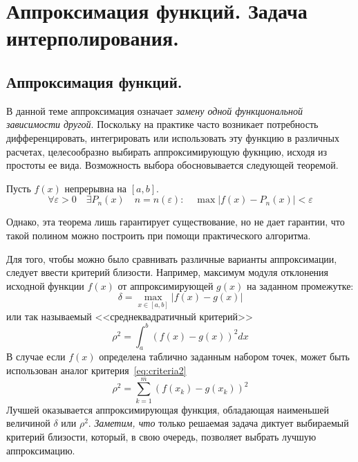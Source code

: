 \documentclass[../../calc-math-exam-2023.tex]{subfiles}
\begin{document}
    \section{Аппроксимация функций. Задача интерполирования.}\label{sec:ch05}
    \subsection{Аппроксимация функций.}
    В данной теме аппроксимация означает \emph{замену одной функциональной зависимости
    другой}. Поскольку на практике часто возникает потребность дифференцировать,
    интегрировать или использовать эту функцию в различных расчетах, целесообразно
    выбирать аппроксимирующую фукнцию, исходя из простоты ее вида. Возможность выбора
    обосновывается следующей теоремой.
    \begin{theorem}
        Пусть $f(x)$ непрерывна на $[a, b]$.
        \begin{equation*}
            \forall \varepsilon > 0 \quad \exists P_n(x) \quad n = n(\varepsilon) : \quad \max |f(x) - P_n(x)| < \varepsilon
        \end{equation*}
    \end{theorem}
    Однако, эта теорема лишь гарантирует существование, но не дает гарантии, что такой полином
    можно построить при помощи практического алгоритма.

    Для того, чтобы можно было сравнивать различные варианты аппроксимации, следует
    ввести критерий близости. Например, максимум модуля отклонения исходной функции
    $f(x)$ от аппроксимирующей $g(x)$ на заданном промежутке:
    \begin{equation}
        \delta = \max_{x \in [a, b]} |f(x) - g(x)|\label{eq:criteria1}
    \end{equation}
    или так называемый <<среднеквадратичный критерий>>
    \begin{equation}
        \rho^2 = \int_a^b \left( f(x) - g(x) \right)^2 dx\label{eq:criteria2}
    \end{equation}
    В случае если $f(x)$ определена таблично заданным набором точек, может быть использован
    аналог критерия~\eqref{eq:criteria2}
    \begin{equation}
        \rho^2 = \sum_{k=1}^m \left( f(x_k) - g(x_k) \right)^2\label{eq:criteria3}
    \end{equation}
    Лучшей оказывается аппроксимирующая функция, обладающая наименьшей величиной $\delta$ или $\rho^2$.
    \emph{Заметим, что} только решаемая задача диктует выбираемый критерий близости, который, в свою очередь,
    позволяет выбрать лучшую аппроксимацию.
\end{document}
